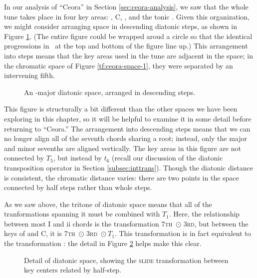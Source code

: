 {In our analysis of ``Ceora'' in Section \ref{sec:ceora-analysis}, we saw that
the whole tune takes place in four key areas: \Dflat, C, \Bflat, and the tonic
\Aflat. Given this organization, we might consider arranging \tf space in
descending diatonic steps, as shown in Figure \ref{tfe:ab-diatonic-space}.
(The entire figure could be wrapped aroud a circle so that the identical \tfo
progressions in \Aflat\ at the top and bottom of the figure line up.) This
arrangement into steps means that the key areas used in the tune are adjacent
in the space; in the chromatic space of Figure \ref{tf:ceora-space-1}, they
were separated by an intervening fifth.

\begin{figure}[tbp]
  \caption{An \Aflat{}-major diatonic \tf space, arranged in descending steps.}
  \label{tfe:ab-diatonic-space}
\end{figure}

This figure is structurally a bit different than the other spaces we have been
exploring in this chapter, so it will be helpful to examine it in some detail
before returning to ``Ceora.'' The arrangement into descending steps means
that we can no longer align all of the seventh chords sharing a root; instead,
only the major and minor sevenths are aligned vertically. The key areas in
this figure are not connected by $T_5$, but instead by $t_6$ (recall our
discussion of the diatonic transposition operator in Section
\ref{subsec:inttrans}). Though the diatonic distance is consistent, the
chromatic distance varies: there are two points in the space connected by half
steps rather than whole steps.

As we saw above, the tritone of diatonic space means that all of the
tranformations spanning it must be combined with $T_1$. Here, the relationship
between most I and ii chords is the transformation
\textsc{7th}~$\odot$ \textsc{3rd}, but between the keys of \Dflat and C, it is
\textsc{7th}~$\odot$ \textsc{3rd}~$\odot\ T_1$. This transformation is in fact
equivalent to the transformation \slideS: the detail in Figure
\ref{tfe:diatonic-space-detail} helps make this clear.

\begin{figure}[htbp]
  \caption{Detail of diatonic \tf space, showing the \textsc{slide}
    transformation between key centers related by half-step.}
  \label{tfe:diatonic-space-detail}
\end{figure}

}
